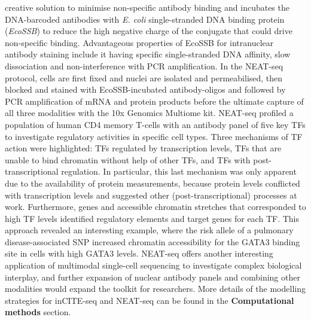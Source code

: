 \documentclass[times, twoside, watermark]{zHenriquesLab-StyleBioRxiv}
\begin{document}
creative solution to minimise non-specific antibody binding and incubates the DNA-barcoded antibodies with \textit{E. coli} single-stranded DNA binding protein (\textit{EcoSSB}) to reduce the high negative charge of the conjugate that could drive non-specific binding. Advantageous properties of EcoSSB for intranuclear antibody staining include it having specific single-stranded DNA affinity, slow dissociation and non-interference with PCR amplification. In the NEAT-seq protocol, cells are first fixed and nuclei are isolated and permeabilised, then blocked and stained with EcoSSB-incubated antibody-oligos and followed by PCR amplification of mRNA and protein products before the ultimate capture of all three modalities with the 10x Genomics Multiome kit. NEAT-seq profiled a population of human CD4 memory T-cells with an antibody panel of five key TFs to investigate regulatory activities in specific cell types. Three mechanisms of TF action were highlighted: TFs regulated by transcription levels, TFs that are unable to bind chromatin without help of other TFs, and TFs with post-transcriptional regulation. In particular, this last mechanism was only apparent due to the availability of protein measurements, because protein levels conflicted with transcription levels and suggested other (post-transcriptional) processes at work. Furthermore, genes and accessible chromatin stretches that corresponded to high TF levels identified regulatory elements and target genes for each TF. This approach revealed an interesting example, where the risk allele of a pulmonary disease-associated SNP increased chromatin accessibility for the GATA3 binding site in cells with high GATA3 levels. \newline NEAT-seq offers another interesting application of multimodal single-cell sequencing to investigate complex biological interplay, and further expansion of nuclear antibody panels and combining other modalities would expand the toolkit for researchers. More details of the modelling strategies for inCITE-seq and NEAT-seq can be found in the \textbf{Computational methods} section.
\end{document}
